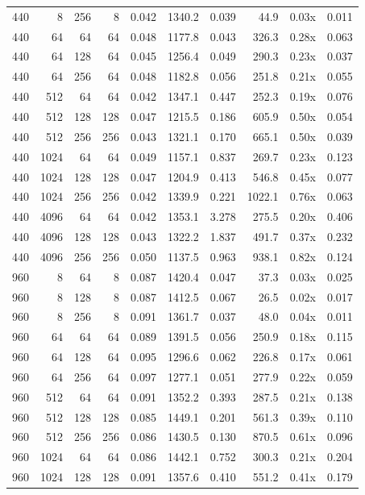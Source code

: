 {\begin{longtable}{rrrrrrrrrr}
440 & 8 & 256 & 8 & 0.042 & 1340.2 & 0.039 & 44.9 & 0.03x & 0.011\\
440 & 64 & 64 & 64 & 0.048 & 1177.8 & 0.043 & 326.3 & 0.28x & 0.063\\
440 & 64 & 128 & 64 & 0.045 & 1256.4 & 0.049 & 290.3 & 0.23x & 0.037\\
440 & 64 & 256 & 64 & 0.048 & 1182.8 & 0.056 & 251.8 & 0.21x & 0.055\\
440 & 512 & 64 & 64 & 0.042 & 1347.1 & 0.447 & 252.3 & 0.19x & 0.076\\
440 & 512 & 128 & 128 & 0.047 & 1215.5 & 0.186 & 605.9 & 0.50x & 0.054\\
440 & 512 & 256 & 256 & 0.043 & 1321.1 & 0.170 & 665.1 & 0.50x & 0.039\\
440 & 1024 & 64 & 64 & 0.049 & 1157.1 & 0.837 & 269.7 & 0.23x & 0.123\\
440 & 1024 & 128 & 128 & 0.047 & 1204.9 & 0.413 & 546.8 & 0.45x & 0.077\\
440 & 1024 & 256 & 256 & 0.042 & 1339.9 & 0.221 & 1022.1 & 0.76x & 0.063\\
440 & 4096 & 64 & 64 & 0.042 & 1353.1 & 3.278 & 275.5 & 0.20x & 0.406\\
440 & 4096 & 128 & 128 & 0.043 & 1322.2 & 1.837 & 491.7 & 0.37x & 0.232\\
440 & 4096 & 256 & 256 & 0.050 & 1137.5 & 0.963 & 938.1 & 0.82x & 0.124\\
960 & 8 & 64 & 8 & 0.087 & 1420.4 & 0.047 & 37.3 & 0.03x & 0.025\\
960 & 8 & 128 & 8 & 0.087 & 1412.5 & 0.067 & 26.5 & 0.02x & 0.017\\
960 & 8 & 256 & 8 & 0.091 & 1361.7 & 0.037 & 48.0 & 0.04x & 0.011\\
960 & 64 & 64 & 64 & 0.089 & 1391.5 & 0.056 & 250.9 & 0.18x & 0.115\\
960 & 64 & 128 & 64 & 0.095 & 1296.6 & 0.062 & 226.8 & 0.17x & 0.061\\
960 & 64 & 256 & 64 & 0.097 & 1277.1 & 0.051 & 277.9 & 0.22x & 0.059\\
960 & 512 & 64 & 64 & 0.091 & 1352.2 & 0.393 & 287.5 & 0.21x & 0.138\\
960 & 512 & 128 & 128 & 0.085 & 1449.1 & 0.201 & 561.3 & 0.39x & 0.110\\
960 & 512 & 256 & 256 & 0.086 & 1430.5 & 0.130 & 870.5 & 0.61x & 0.096\\
960 & 1024 & 64 & 64 & 0.086 & 1442.1 & 0.752 & 300.3 & 0.21x & 0.204\\
960 & 1024 & 128 & 128 & 0.091 & 1357.6 & 0.410 & 551.2 & 0.41x & 0.179\\

\end{longtable}}
